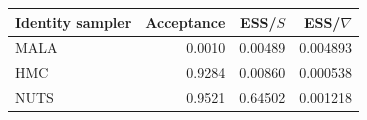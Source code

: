 \begin{tabular}{lrrr}
    \toprule
    Identity sampler & Acceptance & ESS/$S$ & ESS/$\nabla$ \\
    \midrule
    MALA             & 0.0010     & 0.00489 & 0.004893     \\
    HMC              & 0.9284     & 0.00860 & 0.000538     \\
    NUTS             & 0.9521     & 0.64502 & 0.001218     \\
    \bottomrule
\end{tabular}
